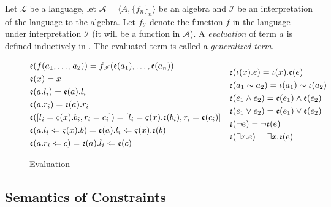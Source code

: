 \begin{defn}[Evaluation]
  Let $\mathcal{L}$ be a language, let $\mathcal{A} = \langle A , \{f_n\}_n
  \rangle$ be an algebra and $\mathscr{I}$ be an interpretation of the language
  to the algebra. Let $f_{\mathscr{I}}$ denote the function $f$ in the language
  under interpretation $\mathscr{I}$ (it will be a function in $\mathcal{A}$). A
  \emph{evaluation} of term $a$ is defined inductively in .
  The evaluated term is called a \emph{generalized term}.
  \begin{figure*}[t]
    \centering
  \begin{align*}
    \begin{aligned}
      & \mathfrak{e}({f(a_1 , \ldots, a_2)}) = f_{\mathscr{I}}(\mathfrak{e}({a_1}) , \ldots , \mathfrak{e}({a_n}))\\
      & \mathfrak{e}({x}) = x\\
      & \mathfrak{e}({a.l_i}) = \mathfrak{e}({a}).l_i\\
      & \mathfrak{e}({a.r_i}) = \mathfrak{e}({a}).r_i\\
      & \mathfrak{e}({[l_i = \varsigma(x) . b_i , r_i = c_i]}) =  [l_i = \varsigma(x) . \mathfrak{e}({b_i}) , r_i = \mathfrak{e}({c_i})]\\
      & \mathfrak{e}({a.l_i \Leftarrow \varsigma (x) . b}) = \mathfrak{e}({a}).l_i \Leftarrow \varsigma(x) . \mathfrak{e}({b})\\
      & \mathfrak{e}({a.r_i \Leftarrow c}) = \mathfrak{e}({a}).l_i \Leftarrow \mathfrak{e}({c})
    \end{aligned}
        \quad
    \begin{aligned}
      & \mathfrak{e}({\iota(x) . e}) = \iota(x) . \mathfrak{e}({e})\\
      & \mathfrak{e}({a_1 \sim a_2}) = \iota(a_1) \sim \iota(a_2)\\
      & \mathfrak{e}({e_1 \land e_2}) = \mathfrak{e}({e_1}) \land \mathfrak{e}({e_2})\\
      & \mathfrak{e}({e_1 \vee e_2})   = \mathfrak{e}({e_1}) \vee \mathfrak{e}({e_2})\\
      & \mathfrak{e}({\neg e})         = \neg \mathfrak{e}({e})\\
      & \mathfrak{e}({\exists x . e }) = \exists x . \mathfrak{e}({e})\\
    \end{aligned}
  \end{align*}
    \caption{Evaluation}
    \label{Oc:evaluation}
  \end{figure*}

\end{defn}

\subsection{Semantics of Constraints}

